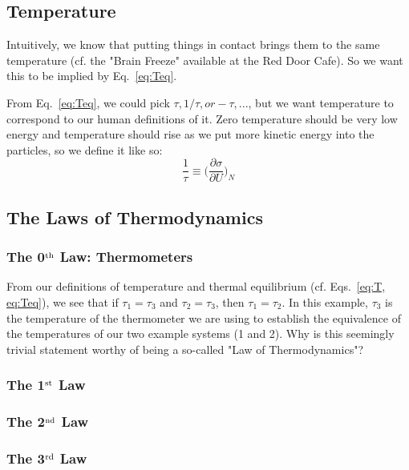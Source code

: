 \subsection{Temperature}
\label{s:Temperature}

Intuitively, we know that putting things in contact brings them to the same temperature
(cf. the "Brain Freeze" available at the Red Door Cafe). So we want this to be
implied by Eq.~\ref{eq:Teq}.

From Eq.~\ref{eq:Teq}, we could pick $\tau, 1/\tau, or -\tau,...$, but we want temperature
to correspond to our human definitions of it. Zero temperature should be very low energy
and temperature should rise as we put more kinetic energy into the particles, so we define
it like so:
\begin{equation}
\frac{1}{\tau} \equiv \bigg(\frac{\partial \sigma}{\partial U}\bigg)_{N}
\label{eq:T}
\end{equation}

\subsection{The Laws of Thermodynamics}

\subsubsection{The 0$^{\rm th}$ Law: Thermometers}
From our definitions of temperature and thermal equilibrium (cf. Eqs.~\ref{eq:T, eq:Teq}), 
we see that if $\tau_1 = \tau_3$ and $\tau_2 = \tau_3$, then $\tau_1 = \tau_2$. In this example,
$\tau_3$ is the temperature of the thermometer we are using to establish the equivalence of the
temperatures of our two example systems (1 and 2). Why is this seemingly trivial statement worthy
of being a so-called "Law of Thermodynamics"? 

\subsubsection{The 1$^{\rm st}$ Law}

\subsubsection{The 2$^{\rm nd}$ Law}

\subsubsection{The 3$^{\rm rd}$ Law}



